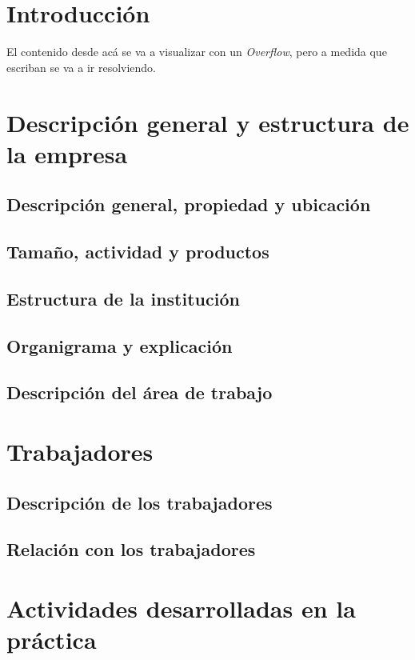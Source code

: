 \section{Introducción}

El contenido desde acá se va a visualizar con un \textit{Overflow}, pero a medida que escriban se va a ir resolviendo.

\section{Descripción general y estructura de la empresa}
\subsection{Descripción general, propiedad y ubicación}
\subsection{Tamaño, actividad y productos}
\subsection{Estructura de la institución}
\subsection{Organigrama y explicación}
\subsection{Descripción del área de trabajo}

\section{Trabajadores}
\subsection{Descripción de los trabajadores}
\subsection{Relación con los trabajadores}

\section{Actividades desarrolladas en la práctica}
